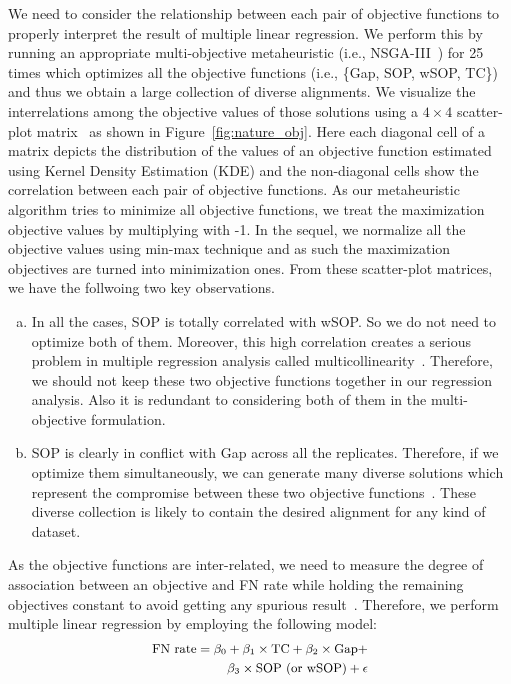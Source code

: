 We need to consider the relationship between each pair of objective functions to properly interpret the result of multiple linear regression. We perform this by running an appropriate multi-objective metaheuristic (i.e., NSGA-III~\citep{deb2014evolutionary}) for 25 times which optimizes all the objective functions (i.e., \{Gap, SOP, wSOP, TC\})  and thus we obtain a large collection of diverse alignments. We visualize the interrelations among the objective values of those solutions using a $ 4\times4 $ scatter-plot matrix~\cite{kalyanmoy2001multi} as shown in Figure~\ref{fig:nature_obj}. Here each diagonal cell of a matrix depicts the distribution of the values of an objective function estimated using Kernel Density Estimation (KDE) and the non-diagonal cells show the correlation between each pair of objective functions. As our metaheuristic algorithm tries to minimize all objective functions, we treat the maximization objective values by multiplying with -1. In the sequel, we normalize all the objective values using min-max technique and as such the maximization objectives are turned into minimization ones. From these scatter-plot matrices, we have the follwoing two key observations.
\begin{enumerate}[(a)]
	
	\item In all the cases, SOP is totally correlated with wSOP. So we do not need to optimize both of them. Moreover, this high correlation creates a serious problem in multiple regression analysis called multicollinearity~\citep{montgomery2012introduction}. Therefore, we should not keep these two objective functions together in our regression analysis. Also it is redundant to considering both of them in the multi-objective formulation. 
	
	\item SOP is clearly in conflict with Gap across all the replicates. Therefore, if we optimize them simultaneously, we can generate many diverse solutions which represent the compromise between these two objective functions~\citep{kalyanmoy2001multi}. These diverse collection is likely to contain the desired alignment for any kind of dataset.
	
\end{enumerate}

As the objective functions are inter-related, we need to measure the degree of association between an objective and FN rate while holding the remaining objectives constant to avoid getting any spurious result~\citep{montgomery2012introduction}. Therefore, we perform multiple linear regression by employing the following model:
\begin{equation}
\small
\begin{split}
\text{FN rate} = \beta_0 + \beta_1 \times \text{TC}+ \beta_2 \times \text{Gap} + \\
\beta_3 \times \text{SOP (or wSOP)} + \epsilon \label{eq:multi_lin_reg}
\end{split}
\end{equation}

